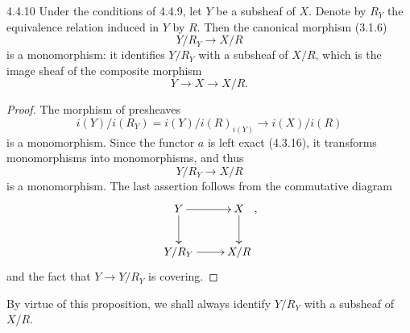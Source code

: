 \begin{proposition}{4.4.10}\label{IV.4.4.10}
Under the conditions of 4.4.9, let \(Y\) be a subsheaf of \(X\).
Denote by \(R_Y\) the equivalence relation induced in \(Y\) by \(R\).
Then the canonical morphism (3.1.6)
\[
Y/R_Y\longrightarrow X/R
\]
is a monomorphism: it identifies \(Y/R_Y\) with a subsheaf of
\(X/R\), which is the image sheaf of the composite morphism
\[
Y\longrightarrow X\longrightarrow X/R.
\]
\end{proposition}
\begin{proof}
The morphism of presheaves
\[
i(Y)/i(R_Y)=i(Y)/i(R)_{i(Y)}\longrightarrow i(X)/i(R)
\]
is a monomorphism. Since the functor \(a\) is left exact
(4.3.16), it transforms monomorphisms into monomorphisms, and thus
\[
Y/R_Y\longrightarrow X/R
\]
is a monomorphism. The last assertion follows from the commutative diagram
\[
\xymatrix{Y\ar[r]\ar[d] & X\ar[d]\\
Y/R_Y\ar[r] & X/R },
\]
and the fact that \(Y\to Y/R_Y\) is covering.
\end{proof}
By virtue of this proposition, we shall always identify \(Y/R_Y\)
with a subsheaf of \(X/R\).
